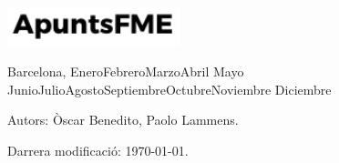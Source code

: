 \begin{titlepage}
	
	\vspace{2\baselineskip} %
	
	
	\vfill %
	
	
	\includegraphics[width=5cm]{../logo.pdf}
	
	\vspace{0.3\baselineskip} %
	
	Barcelona, {\ifcase \month \or Enero\or Febrero\or Marzo\or Abril\or
    Mayo \or Junio\or Julio\or Agosto\or Septiembre\or Octubre\or Noviembre\or
    Diciembre\fi \:  \number \year} %
	
	
	
\end{titlepage}

\vspace*{\fill}

\noindent Autors: Òscar Benedito, Paolo Lammens.
%
%

\noindent Darrera modificació: \today.

\doclicenseThis

